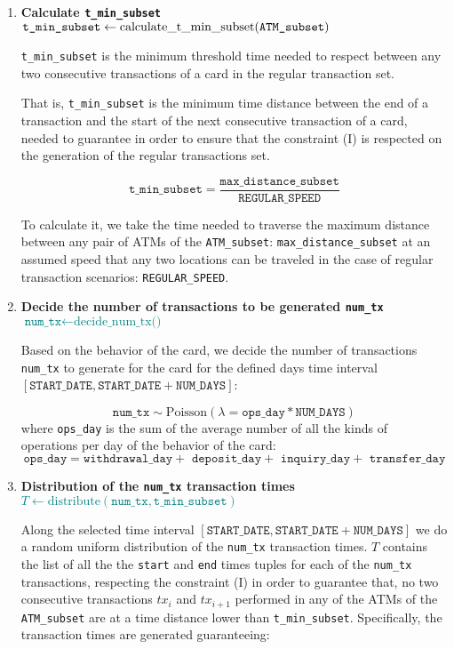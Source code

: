 \begin{enumerate}
    \item \textbf{Calculate \texttt{t\_min\_subset}} \\
    {\footnotesize\textcolor{teal}{$\texttt{t\_min\_subset} \gets \text{calculate\_t\_min\_subset(\texttt{ATM\_subset})}$}}

    \texttt{t\_min\_subset} is the minimum threshold time needed to respect between any two consecutive transactions of a card in the regular transaction set.
    
    That is, \texttt{t\_min\_subset} is the minimum time distance between the end of a transaction and the start of the next consecutive transaction of a card, needed to guarantee in order to ensure that the constraint (I) is respected on the generation of the regular transactions set.
    
    $$\texttt{t\_min\_subset} = \frac{\texttt{max\_distance\_subset}}{\texttt{REGULAR\_SPEED}}$$

    To calculate it, we take the time needed to traverse the maximum distance between any pair of ATMs of the \texttt{ATM\_subset}: \texttt{max\_distance\_subset} at an assumed speed that any two locations can be traveled in the case of regular transaction scenarios: \texttt{REGULAR\_SPEED}.

    \item \textbf{Decide the number of transactions to be generated \texttt{num\_tx}}\\
    {\footnotesize \textcolor{teal}{$\texttt{num\_tx} \gets \text{decide\_num\_tx()}$}}
    
    Based on the behavior of the card, we decide the number of transactions \texttt{num\_tx} to generate for the card for the defined days time interval $[\texttt{START\_DATE}, \texttt{START\_DATE} + \texttt{NUM\_DAYS}]$:

    $$\texttt{num\_tx} \sim \text{Poisson}(\lambda = \texttt{ops\_day} * \texttt{NUM\_DAYS})$$ where \texttt{ops\_day} is the sum of the average number of all the kinds of operations per day of the behavior of the card: 
    $$\texttt{ops\_day} = \texttt{withdrawal\_day} + \texttt{ deposit\_day} + \texttt{ inquiry\_day} + \texttt{ transfer\_day}$$

    \item \textbf{Distribution of the \texttt{num\_tx} transaction times} \\
     {\footnotesize \textcolor{teal}{$T \gets \text{distribute}(\texttt{num\_tx}, \texttt{t\_min\_subset})$}}
    
    Along the selected time interval $[\texttt{START\_DATE}, \texttt{START\_DATE} + \texttt{NUM\_DAYS}]$ we do a random uniform distribution of the \texttt{num\_tx} transaction times. $T$ contains the list of all the the \texttt{start} and \texttt{end} times tuples for each of the \texttt{num\_tx} transactions, respecting the constraint (I) in order to guarantee that, no two consecutive transactions $tx_i$ and $tx_{i+1}$ performed in any of the ATMs of the \texttt{ATM\_subset} are at a time distance lower than \texttt{t\_min\_subset}. Specifically, the transaction times are generated guaranteeing:


\end{enumerate}
